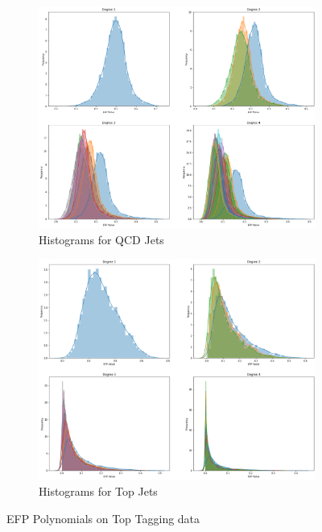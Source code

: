 \begin{figure}
    \centering
    \begin{subfigure}[b]{0.49\textwidth}
        \includegraphics[width=\textwidth]{img/efp-qcd-particlenetdata.png}
        \caption{Histograms for QCD Jets}
    \end{subfigure}
    \begin{subfigure}[b]{0.49\textwidth}
        \includegraphics[width=\textwidth]{img/efp-top-particlenetdata.png}
        \caption{Histograms for Top Jets}
    \end{subfigure}
    \caption{EFP Polynomials on Top Tagging data}
    \label{fig:efp-histogram}
\end{figure}

